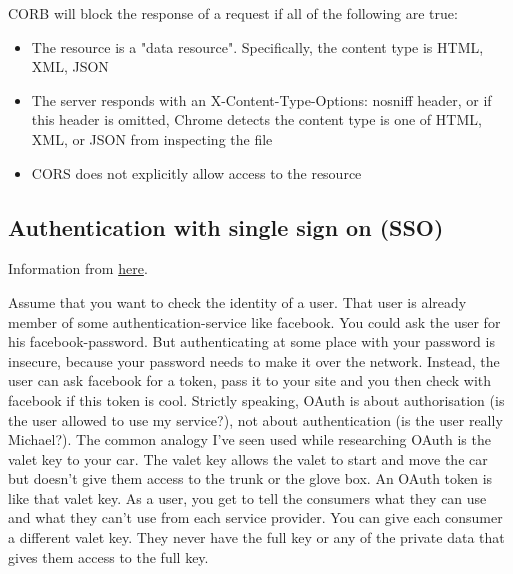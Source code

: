 CORB will block the response of a request if all of the following are true:
\begin{itemize}
	\item The resource is a "data resource". Specifically, the content type is HTML, XML, JSON
	\item The server responds with an X-Content-Type-Options: nosniff header, or if this header is omitted, Chrome detects the content type is one of HTML, XML, or JSON from inspecting the file
	\item CORS does not explicitly allow access to the resource
\end{itemize}


\subsection{Authentication with single sign on (SSO)}
Information from \href{https://www.varonis.com/blog/what-is-oauth/}{here}.

Assume that you want to check the identity of a user. That user is already member of some authentication-service like facebook. You could ask the user for his facebook-password. But authenticating at some place with your password is insecure, because your password needs to make it over the network. Instead, the user can ask facebook for a token, pass it to your site and you then check with facebook if this token is cool. 
Strictly speaking, OAuth is about authorisation (is the user allowed to use my service?), not about authentication (is the user really Michael?). The common analogy I’ve seen used while researching OAuth is the valet key to your car. The valet key allows the valet to start and move the car but doesn’t give them access to the trunk or the glove box. An OAuth token is like that valet key. As a user, you get to tell the consumers what they can use and what they can’t use from each service provider. You can give each consumer a different valet key. They never have the full key or any of the private data that gives them access to the full key.

